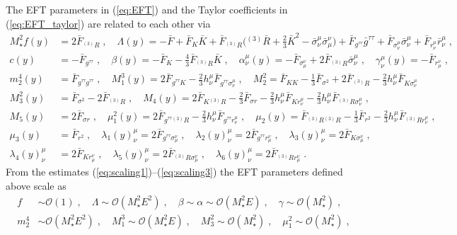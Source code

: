 \documentclass[a4paper,11pt]{article}
\numberwithin{equation}{section}
\begin{document}
The EFT parameters in (\ref{eq:EFT}) and the Taylor coefficients in (\ref{eq:EFT_taylor}) are related to each other via
\begin{align}
M_\star^2 f(y) &= 2 \bar{F}_{{}^{(3)}\!R} \;, \quad \Lambda(y) = - \bar{F} + \bar{F}_{K} \bar{K}  + \bar{F}_{{}^{(3)}\!R} \bigg({}^{(3)}\!\bar{R} + \frac{2}{3} \bar{K}^2 - \bar{\sigma}^\mu_\nu \bar{\sigma}^\nu_\mu \bigg) + \bar{F}_{g^{\tau\tau}} \bar{g}^{\tau\tau} + \bar{F}_{\sigma^\mu_\nu}\bar{\sigma}^\mu_\nu + \bar{F}_{r^\mu_\nu}\bar{r}^\mu_\nu\;, \nonumber \\
c(y) &= - \bar{F}_{g^{\tau\tau}} \;, \quad \beta(y) = - \bar{F}_K - \frac{4}{3} \bar{F}_{{}^{(3)}\!R} \bar{K} \;, \quad \alpha^\mu_\nu(y) = -\bar{F}_{\sigma^\nu_\mu} + 2 \bar{F}_{{}^{(3)}\!R}\bar{\sigma}^\mu_\nu \;, \quad \gamma^\mu_\nu(y) = -\bar{F}_{r^\nu_\mu} \;, \nonumber \\
m_2^4(y) &= \bar{F}_{g^{\tau\tau}g^{\tau\tau}} \;, \quad M_1^3(y) = 2\bar{F}_{g^{\tau\tau}K} - \frac{2}{3}h^\mu_\nu \bar{F}_{g^{\tau\tau} \sigma^\mu_\nu}  \;, \quad M_2^2 = \bar{F}_{KK} - \frac{1}{3}\bar{F}_{\sigma^2} + 2\bar{F}_{{}^{(3)}\!R} - \frac{2}{3} h^\mu_\nu \bar{F}_{K \sigma^\mu_\nu} \nonumber  \\
M_3^2(y) &= \bar{F}_{\sigma^2} - 2\bar{F}_{{}^{(3)}\!R} \;, \quad  M_4(y) = 2\bar{F}_{K{}^{(3)}\!R} - \frac{2}{3}\bar{F}_{\sigma r} - \frac{2}{3} h^\mu_\nu \bar{F}_{K r^\mu_\nu} - \frac{2}{3} h^\mu_\nu \bar{F}_{{}^{(3)}\!R \sigma^\mu_\nu} \;, \label{eq:EFT_parameters} \\
M_5(y) &= 2 \bar{F}_{\sigma r} \;, \quad \mu_1^2(y) = 2\bar{F}_{g^{\tau\tau}{}^{(3)}\!R} - \frac{2}{3} h^\mu_\nu \bar{F}_{g^{\tau\tau} r^\mu_\nu} \;, \quad \mu_2(y) = \bar{F}_{{}^{(3)}\!R{}^{(3)}\!R} - \frac{1}{3} \bar{F}_{r^2} - \frac{2}{3} h^\mu_\nu \bar{F}_{{}^{(3)}\!R r^\mu_\nu} \;, \nonumber \\
\mu_3(y) &= \bar{F}_{r^2} \;, \quad \lambda_1(y)^\mu_\nu = 2 \bar{F}_{g^{\tau\tau} \sigma^\nu_\mu} \;, \quad \lambda_2(y)^\mu_\nu = 2 \bar{F}_{g^{\tau\tau} r^\nu_\mu} \;,\quad \lambda_3(y)^\mu_\nu = 2 \bar{F}_{K \sigma^\nu_\mu}\;, \nonumber \\ 
\lambda_4(y)^\mu_\nu &= 2 \bar{F}_{K r^\nu_\mu}  \;, \quad \lambda_5(y)^\mu_\nu = 2 \bar{F}_{{}^{(3)}\!R \sigma^\nu_\mu} \;, \quad \lambda_6(y)^\mu_\nu = 2 \bar{F}_{{}^{(3)}\!R r^\nu_\mu} \;. \nonumber 
\end{align}
From the estimates (\ref{eq:scaling1})--(\ref{eq:scaling3}) the EFT parameters defined above scale as
\begin{align}
f &\sim \mathcal{O}(1) \;, \quad \Lambda \sim  \mathcal{O}(M_\star^2 E^2) \;, \quad \beta \sim \alpha \sim \mathcal{O}(M_\star^2 E) \;, \quad \gamma \sim \mathcal{O}(M_\star^2) \;, \\
m_2^4 &\sim \mathcal{O}(M_\star^2 E^2) \;, \quad M_1^3 \sim \mathcal{O}(M_\star^2 E) \;, \quad M_3^2 \sim \mathcal{O}(M_\star^2) \;, \quad \mu_1^2 \sim \mathcal{O}(M_\star^2) \;,
\end{align}
\end{document}
